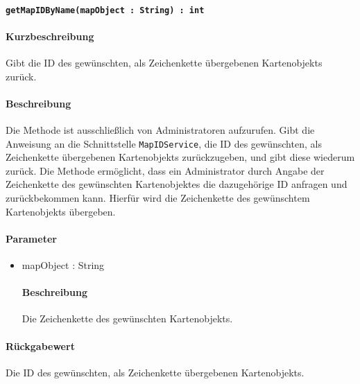 \paragraph{\texttt{getMapIDByName(mapObject : String) : int}}%
\paragraph*{Kurzbeschreibung}
Gibt die ID des gewünschten, als Zeichenkette übergebenen Kartenobjekts zurück.
\paragraph*{Beschreibung}
Die Methode ist ausschließlich von Administratoren aufzurufen.
Gibt die Anweisung an die Schnittstelle \texttt{MapIDService}, die ID des gewünschten, als Zeichenkette übergebenen Kartenobjekts zurückzugeben, und gibt diese wiederum zurück.
Die Methode ermöglicht, dass ein Administrator durch Angabe der Zeichenkette des gewünschten Kartenobjektes die dazugehörige ID anfragen und zurückbekommen kann.
Hierfür wird die Zeichenkette des  gewünschtem Kartenobjekts übergeben.
\paragraph*{Parameter}
\begin{itemize}
	\item mapObject : String
		\paragraph*{Beschreibung}
		Die Zeichenkette des gewünschten Kartenobjekts.
\end{itemize}
\paragraph*{Rückgabewert}
Die ID des gewünschten, als Zeichenkette übergebenen Kartenobjekts.
